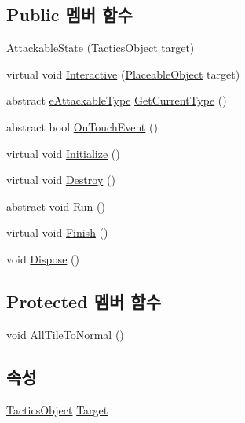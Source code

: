 \subsection*{Public 멤버 함수}
\begin{DoxyCompactItemize}
\item 
\hyperlink{class_attack_decorator_1_1_attackable_state_ab42449bc9d397049c81f2a6e6d2ac9b7}{Attackable\+State} (\hyperlink{class_tactics_object}{Tactics\+Object} target)
\item 
virtual void \hyperlink{class_attack_decorator_1_1_attackable_state_a8dc1edc91e271393dc3097e92c9563a3}{Interactive} (\hyperlink{class_placeable_object}{Placeable\+Object} target)
\item 
abstract \hyperlink{_attack_decorator_8cs_a11dd66d5fec1bd5b34c8ca6934344cad}{e\+Attackable\+Type} \hyperlink{class_attack_decorator_1_1_attackable_state_a02247dd3afd57a7c3a81540b192fbaa7}{Get\+Current\+Type} ()
\item 
abstract bool \hyperlink{class_attack_decorator_1_1_attackable_state_ac9cf679f51eb8a57cab007476c583dca}{On\+Touch\+Event} ()
\item 
virtual void \hyperlink{class_m_c_n_1_1_state_a5be59bc891e64cbbe4322d74a6746908}{Initialize} ()
\item 
virtual void \hyperlink{class_m_c_n_1_1_state_aebf48ef248bbf185d6aae91d9789459e}{Destroy} ()
\item 
abstract void \hyperlink{class_m_c_n_1_1_state_afdec72a816a8a8ec584cac758a027215}{Run} ()
\item 
virtual void \hyperlink{class_m_c_n_1_1_state_a2492ca731678b8216c02134dddeeb745}{Finish} ()
\item 
void \hyperlink{class_m_c_n_1_1_state_af6df0477e0dead784489688cb2c2093e}{Dispose} ()
\end{DoxyCompactItemize}
\subsection*{Protected 멤버 함수}
\begin{DoxyCompactItemize}
\item 
void \hyperlink{class_attack_decorator_1_1_attackable_state_ad1be8431e8606ed79d375fe520b65e47}{All\+Tile\+To\+Normal} ()
\end{DoxyCompactItemize}
\subsection*{속성}
\begin{DoxyCompactItemize}
\item 
\hyperlink{class_tactics_object}{Tactics\+Object} \hyperlink{class_m_c_n_1_1_state_a79a563b32f183c9adc9a96679fc57eb8}{Target}
\end{DoxyCompactItemize}


